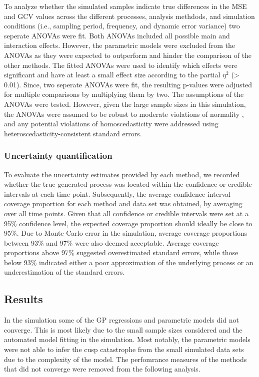 \documentclass[man, floatsintext]{apa7}
\begin{document}
To analyze whether the simulated samples indicate true differences in the
MSE and GCV values across the different processes, analysis methdods, and
simulation conditions (i.e., sampling period, frequency, and dynamic error
variance) two seperate ANOVAs were fit. Both ANOVAs included all possible main
and interaction effects. However, the parametric models were excluded from
the ANOVAs as they were expected to outperform and hinder the comparison
of the other methods. The fitted ANOVAs were used to identify which effects
were significant and have at least a small effect size according to the partial
$\eta^2$ (> 0.01). Since, two seperate ANOVAs were fit, the resulting p-values
were adjusted for multiple comparisons by multiplying them by two. The
assumptions of the ANOVAs were tested. However, given the large sample sizes in
this simulation, the ANOVAs were assumed to be robust to moderate violations of
normality \parencite{blanca_non-normal_2017}, and any potential violations of
homoscedasticity were addressed using heteroscedasticity-consistent standard
errors.

\subsubsection{Uncertainty quantification}

To evaluate the uncertainty estimates provided by each method, we recorded
whether the true generated process was located within the confidence or
credible intervals at each time point. Subsequently, the average confidence
interval coverage proportion for each method and data set was obtained, by
averaging over all time points. Given that all confidence or credible intervals
were set at a 95\% confidence level, the expected coverage proportion should
ideally be close to 95\%. Due to Monte Carlo error in the simulation, average
coverage proportions between 93\% and 97\% were also deemed acceptable. Average
coverage proportions above 97\% suggested overestimated standard errors, while
those below 93\% indicated either a poor approximation of the underlying
process or an underestimation of the standard errors.

\subsection{Results}

In the simulation some of the GP regressions and parametric models did not
converge. This is most likely due to the small sample sizes considered and the
automated model fitting in the simulation. Most notably, the parametric models
were not able to infer the cusp catastrophe from the small simulated data sets
due to the complexity of the model. The perfomrance measures of the methods
that did not converge were removed from the following analysis.
\end{document}

